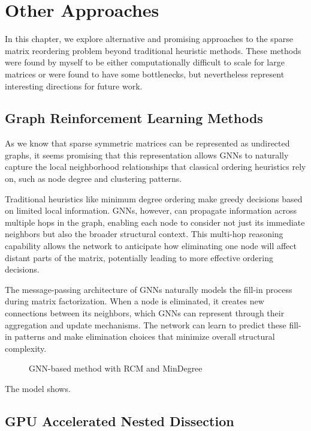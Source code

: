 \chapter{Other Approaches}
\label{ch:other_approaches}

In this chapter, we explore alternative and promising approaches to the sparse matrix reordering problem beyond traditional heuristic methods. These methods were found by myself to be either computationally difficult to scale for large matrices or were found to have some bottlenecks, but nevertheless represent interesting directions for future work. 

\section{Graph Reinforcement Learning Methods}

As we know that sparse symmetric matrices can be represented as undirected graphs, it seems promising that this representation allows GNNs to naturally capture the local neighborhood relationships that classical ordering heuristics rely on, such as node degree and clustering patterns.

Traditional heuristics like minimum degree ordering make greedy decisions based on limited local information. GNNs, however, can propagate information across multiple hops in the graph, enabling each node to consider not just its immediate neighbors but also the broader structural context. This multi-hop reasoning capability allows the network to anticipate how eliminating one node will affect distant parts of the matrix, potentially leading to more effective ordering decisions.

The message-passing architecture of GNNs naturally models the fill-in process during matrix factorization. When a node is eliminated, it creates new connections between its neighbors, which GNNs can represent through their aggregation and update mechanisms. The network can learn to predict these fill-in patterns and make elimination choices that minimize overall structural complexity.

\begin{figure}[htbp]
    \centering
    \begin{bchart}[step=20,max=100,unit=\%]
        \smallskip
    \end{bchart}
    \caption{GNN-based method with RCM and MinDegree}
    \label{fig:graphrl_small}
\end{figure}

The model shows.

\section{GPU Accelerated Nested Dissection}